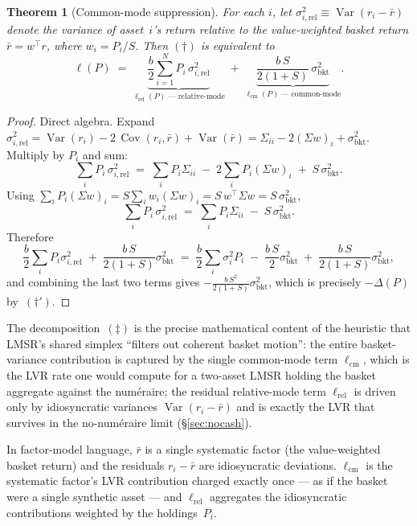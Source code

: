 \documentclass[11pt]{article}
\newtheorem{theorem}{Theorem}
\DeclareMathOperator{\Var}{Var}
\DeclareMathOperator{\Cov}{Cov}
\newcommand{\bkt}{\mathrm{bkt}}
\newcommand{\rel}{\mathrm{rel}}
\newcommand{\cm}{\mathrm{cm}}
\newcommand{\transp}{^{\!\top}}
\begin{document}
\begin{theorem}[Common-mode suppression]\label{thm:cm}
For each $i$, let $\sigma_{i,\rel}^2 \equiv \Var(r_i - \bar r)$ denote the variance of asset~$i$'s return relative to the value-weighted basket return $\bar r = w\transp r$, where $w_i = P_i/S$. Then $(\dagger)$ is equivalent to
\begin{equation*}
\boxed{\;\; \ell(P) \;=\; \underbrace{\frac{b}{2}\sum_{i=1}^N P_i\,\sigma_{i,\rel}^2}_{\ell_{\rel}(P)\ \text{--- relative-mode}} \;+\; \underbrace{\frac{b\, S}{2(1+S)}\,\sigma_{\bkt}^2}_{\ell_{\cm}(P)\ \text{--- common-mode}}. \;\;} \tag{$\ddagger$}
\end{equation*}
\end{theorem}
\begin{proof}
Direct algebra. Expand $\sigma_{i,\rel}^2 = \Var(r_i) - 2\,\Cov(r_i, \bar r) + \Var(\bar r) = \Sigma_{ii} - 2(\Sigma w)_i + \sigma_{\bkt}^2$. Multiply by $P_i$ and sum:
\[
\sum_i P_i\,\sigma_{i,\rel}^2 \;=\; \sum_i P_i \Sigma_{ii} \;-\; 2\sum_i P_i (\Sigma w)_i \;+\; S\,\sigma_{\bkt}^2.
\]
Using $\sum_i P_i (\Sigma w)_i = S\sum_i w_i(\Sigma w)_i = S\,w\transp\Sigma w = S\,\sigma_{\bkt}^2$,
\begin{equation*}
\sum_i P_i\,\sigma_{i,\rel}^2 \;=\; \sum_i P_i \Sigma_{ii} \;-\; S\,\sigma_{\bkt}^2. \tag{$\star$}
\end{equation*}
Therefore
\[
\frac{b}{2}\sum_i P_i \sigma_{i,\rel}^2 \;+\; \frac{b\,S}{2(1+S)}\sigma_{\bkt}^2
\;=\; \frac{b}{2}\sum_i \sigma_i^2 P_i \;-\; \frac{b\,S}{2}\sigma_{\bkt}^2 \;+\; \frac{b\,S}{2(1+S)}\sigma_{\bkt}^2,
\]
and combining the last two terms gives $-\tfrac{b\,S^2}{2(1+S)}\sigma_{\bkt}^2$, which is precisely $-\Delta(P)$ by~$(\dagger')$.
\end{proof}

The decomposition~$(\ddagger)$ is the precise mathematical content of the heuristic that LMSR's shared simplex ``filters out coherent basket motion'': the entire basket-variance contribution is captured by the single common-mode term $\ell_{\cm}$, which is the LVR rate one would compute for a two-asset LMSR holding the basket aggregate against the num\'eraire; the residual relative-mode term $\ell_{\rel}$ is driven only by idiosyncratic variances $\Var(r_i - \bar r)$ and is exactly the LVR that survives in the no-num\'eraire limit (\S\ref{sec:nocash}).

In factor-model language, $\bar r$ is a single systematic factor (the value-weighted basket return) and the residuals $r_i - \bar r$ are idiosyncratic deviations. $\ell_{\cm}$ is the systematic factor's LVR contribution charged exactly once --- as if the basket were a single synthetic asset --- and $\ell_{\rel}$ aggregates the idiosyncratic contributions weighted by the holdings~$P_i$.
\end{document}
